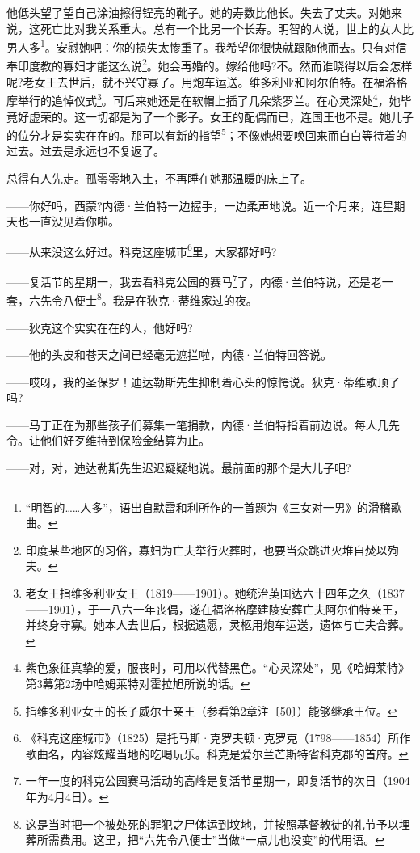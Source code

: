 \par 他低头望了望自己涂油擦得锃亮的靴子。她的寿数比他长。失去了丈夫。对她来说，这死亡比对我关系重大。总有一个比另一个长寿。明智的人说，世上的女人比男人多\footnote{“明智的……人多”，语出自默雷和利所作的一首题为《三女对一男》的滑稽歌曲。}。安慰她吧：你的损失太惨重了。我希望你很快就跟随他而去。只有对信奉印度教的寡妇才能这么说\footnote{印度某些地区的习俗，寡妇为亡夫举行火葬时，也要当众跳进火堆自焚以殉夫。}。她会再婚的。嫁给他吗?不。然而谁晓得以后会怎样呢?老女王去世后，就不兴守寡了。用炮车运送。维多利亚和阿尔伯特。在福洛格摩举行的追悼仪式\footnote{老女王指维多利亚女王（1819——1901）。她统治英国达六十四年之久（1837——1901），于一八六一年丧偶，遂在福洛格摩建陵安葬亡夫阿尔伯特亲王，并终身守寡。她本人去世后，根据遗愿，灵柩用炮车运送，遗体与亡夫合葬。}。可后来她还是在软帽上插了几朵紫罗兰。在心灵深处\footnote{紫色象征真挚的爱，服丧时，可用以代替黑色。“心灵深处”，见《哈姆莱特》第3幕第2场中哈姆莱特对霍拉旭所说的话。}，她毕竟好虚荣的。这一切都是为了一个影子。女王的配偶而已，连国王也不是。她儿子的位分才是实实在在的。那可以有新的指望\footnote{指维多利亚女王的长子威尔士亲王（参看第2章注〔50〕）能够继承王位。}；不像她想要唤回来而白白等待着的过去。过去是永远也不复返了。
\par 总得有人先走。孤零零地入土，不再睡在她那温暖的床上了。
\par ——你好吗，西蒙?内德·兰伯特一边握手，一边柔声地说。近一个月来，连星期天也一直没见着你啦。
\par ——从来没这么好过。科克这座城市\footnote{《科克这座城市》（1825）是托马斯·克罗夫顿·克罗克（1798——1854）所作歌曲名，内容炫耀当地的吃喝玩乐。科克是爱尔兰芒斯特省科克郡的首府。}里，大家都好吗?
\par ——复活节的星期一，我去看科克公园的赛马\footnote{一年一度的科克公园赛马活动的高峰是复活节星期一，即复活节的次日（1904年为4月4日）。}了，内德·兰伯特说，还是老一套，六先令八便士\footnote{这是当时把一个被处死的罪犯之尸体运到坟地，并按照基督教徒的礼节予以埋葬所需费用。这里，把“六先令八便士”当做“一点儿也没变”的代用语。}。我是在狄克·蒂维家过的夜。
\par ——狄克这个实实在在的人，他好吗?
\par ——他的头皮和苍天之间已经毫无遮拦啦，内德·兰伯特回答说。
\par ——哎呀，我的圣保罗！迪达勒斯先生抑制着心头的惊愕说。狄克·蒂维歇顶了吗?
\par ——马丁正在为那些孩子们募集一笔捐款，内德·兰伯特指着前边说。每人几先令。让他们好歹维持到保险金结算为止。
\par ——对，对，迪达勒斯先生迟迟疑疑地说。最前面的那个是大儿子吧?
